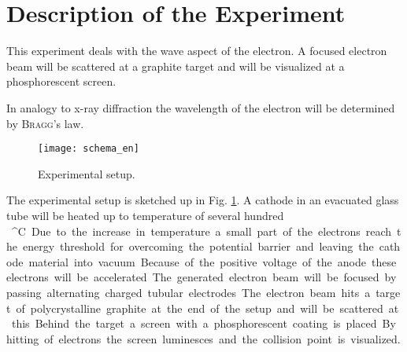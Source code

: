 \documentclass{tudphygp_eng}
\author{M.~Kreller}
\begin{document}
\maketitle

\section{Description of the Experiment}
This experiment deals with the wave aspect of the electron. A focused electron beam will be scattered at a graphite target and will be visualized at a phosphorescent screen.
 
In analogy to x-ray diffraction the wavelength of the electron will be determined by \textsc{Bragg}'s law.
\begin{figure}[htb]
\centering
\texttt{[image: schema\_en]}
\caption{Experimental setup.\label{schema}}
\end{figure}
The experimental setup is sketched up in Fig. \ref{schema}. A cathode in an evacuated glass tube will be heated up to temperature of several hundred \SI{}{^\circ C}. Due to the increase in temperature a small part of the electrons reach the energy threshold for overcoming the potential barrier and leaving the cathode material into vacuum.    
Because of the positive voltage of the anode these electrons will be accelerated. The generated electron beam will be focused by passing alternating charged tubular electrodes. The electron beam hits a target of polycrystalline graphite at the end of the setup and will be scattered at this. Behind the target a screen with a phosphorescent coating is placed. By hitting of electrons the screen luminesces and the collision point is visualized.
\end{document}
